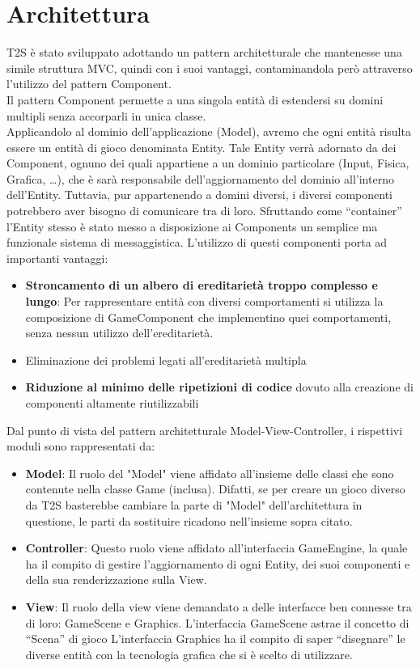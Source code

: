 \documentclass[a4paper,12pt]{report}
\begin{document}
\section{Architettura}
T2S è stato sviluppato adottando un pattern architetturale che mantenesse una simile struttura MVC, quindi con i suoi vantaggi, contaminandola però attraverso l’utilizzo del pattern Component.
\\
Il pattern Component permette a una singola entità di estendersi su domini multipli senza accorparli in unica classe.
\\
Applicandolo al dominio dell’applicazione (Model), avremo che ogni entità risulta essere un entità di gioco denominata Entity.
Tale Entity verrà adornato da dei Component, ognuno dei quali appartiene a un dominio particolare (Input, Fisica, Grafica, …), che è sarà responsabile dell’aggiornamento del dominio all’interno dell’Entity.
Tuttavia, pur appartenendo a domini diversi, i diversi componenti potrebbero aver bisogno di comunicare tra di loro.
Sfruttando come “container” l’Entity stesso è stato messo a disposizione ai Components un semplice ma funzionale sistema di messaggistica.
L’utilizzo di questi componenti porta ad importanti vantaggi:
\begin{itemize}
	\item \textbf{Stroncamento di un albero di ereditarietà troppo complesso e lungo}:
	Per rappresentare entità con diversi comportamenti si utilizza la composizione di GameComponent che implementino quei comportamenti, senza nessun utilizzo dell’ereditarietà.
	\item Eliminazione dei problemi legati all’ereditarietà multipla
	\item \textbf{Riduzione al minimo delle ripetizioni di codice} dovuto alla creazione di componenti altamente riutilizzabili
\end{itemize}
Dal punto di vista del pattern architetturale Model-View-Controller, i rispettivi moduli sono rappresentati da:
\begin{itemize}
	\item \textbf{Model}:
	Il ruolo del "Model" viene affidato all'insieme delle classi che sono contenute nella classe Game (inclusa).
	Difatti, se per creare un gioco diverso da T2S basterebbe cambiare la parte di "Model" dell'architettura in questione, le parti da sostituire ricadono nell'insieme sopra citato.
	\item \textbf{Controller}:
	Questo ruolo viene affidato all’interfaccia GameEngine, la quale ha il compito di gestire l’aggiornamento di ogni Entity, dei suoi componenti e della sua renderizzazione sulla View.
	\item \textbf{View}:
	Il ruolo della view viene demandato a delle interfacce ben connesse tra di loro: GameScene e Graphics.
	L’interfaccia GameScene astrae il concetto di “Scena” di gioco
	L’interfaccia Graphics ha il compito di saper “disegnare” le diverse entità con la 
	tecnologia grafica che si è scelto di utilizzare.
\end{itemize}
\end{document}
